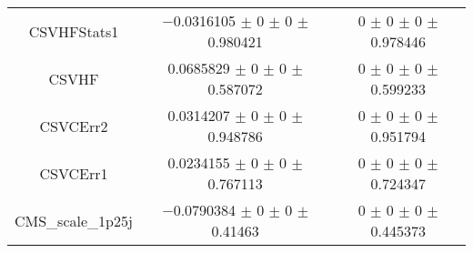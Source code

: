 \begin{table}
\begin{tabular}{ccc}
CSVHFStats1 & \num{-0.0316105} $\pm$ \num{0} $\pm$ \num{0} $\pm$ \num{0.980421} & \num{0} $\pm$ \num{0} $\pm$ \num{0} $\pm$ \num{0.978446}\\
CSVHF & \num{0.0685829} $\pm$ \num{0} $\pm$ \num{0} $\pm$ \num{0.587072} & \num{0} $\pm$ \num{0} $\pm$ \num{0} $\pm$ \num{0.599233}\\
CSVCErr2 & \num{0.0314207} $\pm$ \num{0} $\pm$ \num{0} $\pm$ \num{0.948786} & \num{0} $\pm$ \num{0} $\pm$ \num{0} $\pm$ \num{0.951794}\\
CSVCErr1 & \num{0.0234155} $\pm$ \num{0} $\pm$ \num{0} $\pm$ \num{0.767113} & \num{0} $\pm$ \num{0} $\pm$ \num{0} $\pm$ \num{0.724347}\\
CMS\_scale\_1p25j & \num{-0.0790384} $\pm$ \num{0} $\pm$ \num{0} $\pm$ \num{0.41463} & \num{0} $\pm$ \num{0} $\pm$ \num{0} $\pm$ \num{0.445373}\\
\bottomrule
\end{tabular}
\end{table}